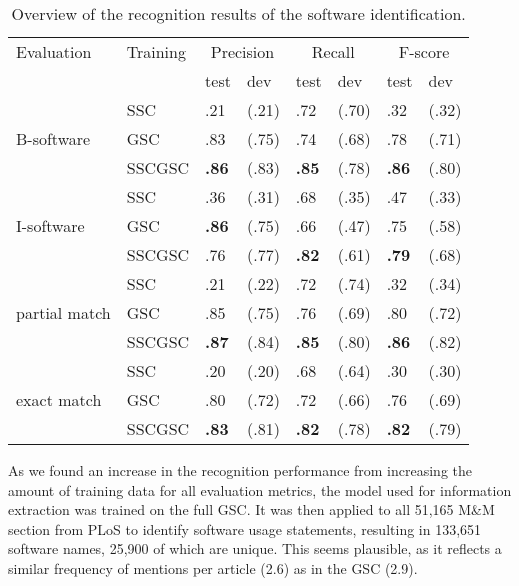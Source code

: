 \documentclass[runningheads]{llncs}
\begin{document}
\begin{table}[tb]
    \centering
    \caption{Overview of the recognition results of the software identification.}
    \label{tab:results}
    \begin{tabularx}{\textwidth}{XXp{1cm}p{1cm}p{1cm}p{1cm}p{1cm}p{1cm}}
      \toprule
    Evaluation & Training & \multicolumn{2}{c}{Precision}  & \multicolumn{2}{c}{Recall} & \multicolumn{2}{c}{F-score} \\ 
    && test & dev & test & dev & test & dev\\
      \midrule
       & SSC & .21 & (.21) & .72 & (.70) & .32 & (.32) \\
      B-software & GSC & .83 & (.75) & .74 & (.68) & .78 & (.71) \\ 
       & SSCGSC & \textbf{.86} & (.83) & \textbf{.85} & (.78) & \textbf{.86} & (.80) \\ 
      \midrule
       & SSC & .36 & (.31) & .68 & (.35) & .47 & (.33) \\ 
      I-software & GSC & \textbf{.86} & (.75) & .66 & (.47) & .75 & (.58) \\ 
       & SSCGSC & .76 & (.77) & \textbf{.82} & (.61) & \textbf{.79} & (.68) \\ 
      \midrule
      & SSC & .21 & (.22) & .72 & (.74) & .32 & (.34) \\ 
      partial match & GSC & .85 & (.75) & .76 & (.69) & .80 & (.72) \\ 
       & SSCGSC & \textbf{.87} & (.84) & \textbf{.85} & (.80) & \textbf{.86} & (.82) \\ 
      \midrule
       & SSC & .20 & (.20) & .68 & (.64) & .30 & (.30) \\ 
      exact match & GSC & .80 & (.72) & .72 & (.66) & .76 & (.69) \\ 
       & SSCGSC & \textbf{.83} & (.81) & \textbf{.82} & (.78) & \textbf{.82} & (.79) \\ 
       \bottomrule
    \end{tabularx}
    \end{table} 
As we found an increase in the recognition performance from increasing the amount of training data for all evaluation metrics, the model used for information extraction was trained on the full GSC.
It was then applied to all 51,165 M\&M section from PLoS to identify software usage statements, resulting in 133,651 software names, 25,900 of which are unique.
This seems plausible, as it reflects a similar frequency of mentions per article (2.6) as in the GSC (2.9).    
\end{document}
